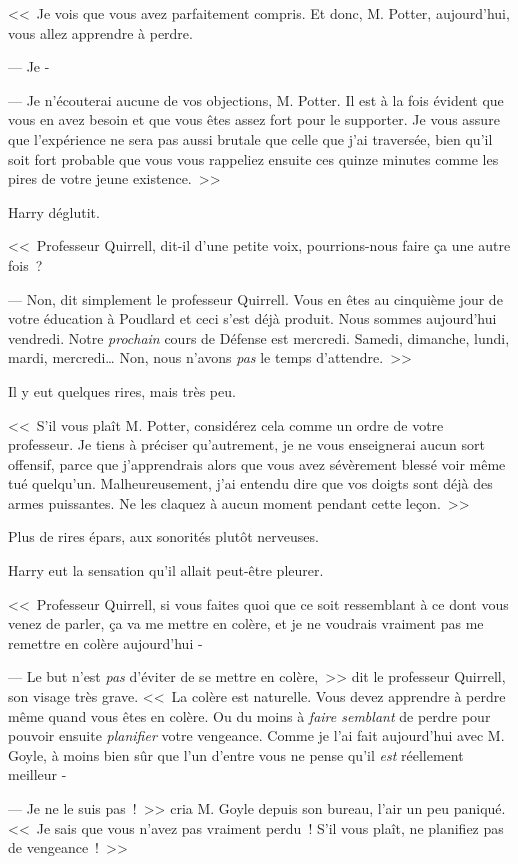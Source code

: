 <<~Je vois que vous avez parfaitement compris. Et donc, M. Potter, aujourd'hui, vous allez apprendre à perdre.

--- Je -

--- Je n'écouterai aucune de vos objections, M. Potter. Il est à la fois évident que vous en avez besoin et que vous êtes assez fort pour le supporter. Je vous assure que l'expérience ne sera pas aussi brutale que celle que j'ai traversée, bien qu'il soit fort probable que vous vous rappeliez ensuite ces quinze minutes comme les pires de votre jeune existence.~>>

Harry déglutit.

<<~Professeur Quirrell, dit-il d'une petite voix, pourrions-nous faire ça une autre fois~?

--- Non, dit simplement le professeur Quirrell. Vous en êtes au cinquième jour de votre éducation à Poudlard et ceci s'est déjà produit. Nous sommes aujourd'hui vendredi. Notre \emph{prochain} cours de Défense est mercredi. Samedi, dimanche, lundi, mardi, mercredi… Non, nous n'avons \emph{pas} le temps d'attendre.~>>

Il y eut quelques rires, mais très peu.

<<~S'il vous plaît M. Potter, considérez cela comme un ordre de votre professeur. Je tiens à préciser qu'autrement, je ne vous enseignerai aucun sort offensif, parce que j'apprendrais alors que vous avez sévèrement blessé voir même tué quelqu'un. Malheureusement, j'ai entendu dire que vos doigts sont déjà des armes puissantes. Ne les claquez à aucun moment pendant cette leçon.~>>

Plus de rires épars, aux sonorités plutôt nerveuses.

Harry eut la sensation qu'il allait peut-être pleurer.

<<~Professeur Quirrell, si vous faites quoi que ce soit ressemblant à ce dont vous venez de parler, ça va me mettre en colère, et je ne voudrais vraiment pas me remettre en colère aujourd'hui -

--- Le but n'est \emph{pas} d'éviter de se mettre en colère,~>> dit le professeur Quirrell, son visage très grave. <<~La colère est naturelle. Vous devez apprendre à perdre même quand vous êtes en colère. Ou du moins à \emph{faire semblant} de perdre pour pouvoir ensuite \emph{planifier} votre vengeance. Comme je l'ai fait aujourd'hui avec M. Goyle, à moins bien sûr que l'un d'entre vous ne pense qu'il \emph{est} réellement meilleur -

--- Je ne le suis pas~!~>> cria M. Goyle depuis son bureau, l'air un peu paniqué. <<~Je sais que vous n'avez pas vraiment perdu~! S'il vous plaît, ne planifiez pas de vengeance~!~>>

